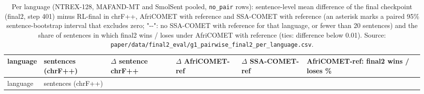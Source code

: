 {\footnotesize\setlength{\tabcolsep}{3pt}
\begin{longtable}[]{@{}
  >{\raggedright\arraybackslash}p{}
  >{\raggedleft\arraybackslash}p{}
  >{\raggedleft\arraybackslash}p{}
  >{\raggedleft\arraybackslash}p{}
  >{\raggedleft\arraybackslash}p{}
  >{\raggedleft\arraybackslash}p{}@{}}
\caption{Per language (NTREX-128, MAFAND-MT and SmolSent pooled, \protect\texttt{no\_pair} rows): sentence-level mean difference of the final checkpoint (final2, step 401) minus RL-final in chrF++, AfriCOMET with reference and SSA-COMET with reference (an asterisk marks a paired 95\% sentence-bootstrap interval that excludes zero; "-\/-": no SSA-COMET with reference for that language, or fewer than 20 sentences) and the share of sentences in which final2 wins / loses under AfriCOMET with reference (ties: difference below 0.01). Source: \protect\texttt{paper/data/final2\_eval/g1\_pairwise\_final2\_per\_language.csv}.}\label{tab:t_final2_pw_perlang}\tabularnewline
\toprule\noalign{}
\begin{minipage}[b]{\linewidth}\raggedright
language
\end{minipage} & \begin{minipage}[b]{\linewidth}\raggedleft
sentences (chrF++)
\end{minipage} & \begin{minipage}[b]{\linewidth}\raggedleft
\(\Delta\) sentence chrF++
\end{minipage} & \begin{minipage}[b]{\linewidth}\raggedleft
\(\Delta\) AfriCOMET-ref
\end{minipage} & \begin{minipage}[b]{\linewidth}\raggedleft
\(\Delta\) SSA-COMET-ref
\end{minipage} & \begin{minipage}[b]{\linewidth}\raggedleft
AfriCOMET-ref: final2 wins / loses \%
\end{minipage} \\
\midrule\noalign{}
\endfirsthead
\toprule\noalign{}
\begin{minipage}[b]{\linewidth}\raggedright
language
\end{minipage} & \begin{minipage}[b]{\linewidth}\raggedleft
sentences (chrF++)
\end{minipage} & \begin{minipage}[b]{\linewidth}\raggedleft

\end{minipage}
\end{longtable}}
